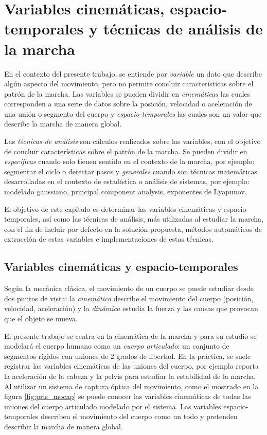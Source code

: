 \chapter[Variables y técnicas]{Variables cinemáticas, espacio-temporales y técnicas de análisis de la marcha}

En el contexto del presente trabajo, se entiende por \emph{variable} un dato que describe algún aspecto del movimiento, pero no permite concluir características sobre el patrón de la marcha. Las variables se pueden dividir en \emph{cinemáticas} las cuales corresponden a una serie de datos sobre la posición, velocidad o aceleración de una unión o segmento del cuerpo y \emph{espacio-temporales} las cuales son un valor que describe la marcha de manera global. 

Las \emph{técnicas de análisis} son cálculos realizados sobre las variables, con el objetivo de concluir características sobre el patrón de la marcha. Se pueden dividir en \emph{específicas} cuando solo tienen sentido en el contexto de la marcha, por ejemplo: segmentar el ciclo o detectar pasos y \emph{generales} cuando son técnicas matemáticas desarrolladas en el contexto de estadística o análisis de sistemas, por ejemplo: modelado gaussiano, principal component analysis, exponentes de Lyapunov.


El objetivo de este capítulo es determinar las variables cinemáticas y espacio-temporales, así como las técnicas de análisis, más utilizadas al estudiar la marcha, con el fin de incluir por defecto en la solución propuesta, métodos automáticos de extracción de estas variables e implementaciones de estas técnicas. 

\section[Variables]{Variables cinemáticas y espacio-temporales}

Según la mecánica clásica, el movimiento de un cuerpo se puede estudiar desde dos puntos de vista: la \emph{cinemática} describe el movimiento del cuerpo (posición, velocidad, aceleración) y la \emph{dinámica} estudia la fuerza y las causas que provocan que el objeto se mueva. \citep{giancoli} 

El presente trabajo se centra en la cinemática de la marcha y para su estudio se modelará el cuerpo humano como un \emph{cuerpo articulado}: un conjunto de segmentos rígidos con uniones de 2 grados de libertad. En la práctica, se suele registrar las variables cinemáticas de las uniones del cuerpo, por ejemplo \cite{menz} reporta la aceleración de la cabeza y la pelvis para estudiar la estabilidad de la marcha. Al utilizar un sistema de captura óptica del movimiento, como el mostrado en la figura \ref{fig:pris_mocap} se puede conocer las variables cinemáticas de todas las uniones del cuerpo articulado modelado por el sistema. Las variables espacio-temporales describen el movimiento del cuerpo como un todo y pretenden describir la marcha de manera global. 

